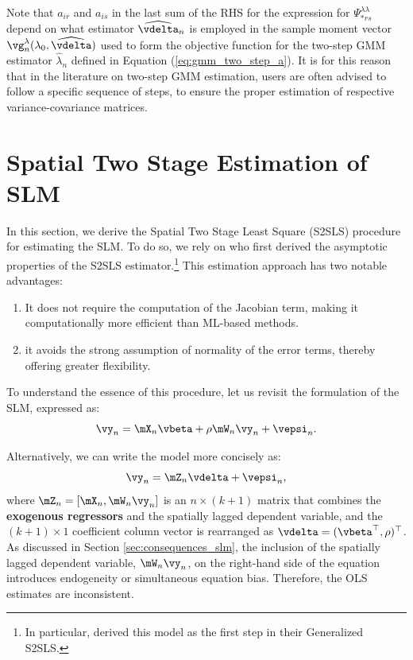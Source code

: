 \documentclass[english,12pt]{book}\usepackage[]{graphicx}\usepackage[]{xcolor}
\begin{document}
Note that $a_{ir}$ and $a_{is}$ in the last sum of the RHS for the expression for $\Psi_{*rs}^{\lambda\lambda}$ depend on what estimator $\widehat{\vdelta}_n$ is employed in the sample moment vector $\vg_n^{\lambda}(\lambda_0, \widehat{\vdelta})$ used to form the objective function for the two-step GMM estimator $\widehat{\lambda}_n$ defined in Equation (\ref{eq:gmm_two_step_a}). It is for this reason that in the literature on two-step GMM estimation, users are often advised to follow a specific sequence of steps, to ensure the proper estimation of respective variance-covariance matrices. 


\section{Spatial Two Stage Estimation of SLM}\label{sec:s2sls}

In this section, we derive the Spatial Two Stage Least Square (S2SLS) procedure for estimating the SLM. To do so, we rely on \cite{kelejian1998generalized} who first derived the asymptotic properties of the S2SLS estimator.\footnote{In particular, \cite{kelejian1998generalized} derived this model as the first step in their Generalized S2SLS.} This estimation approach has two notable advantages:
\begin{enumerate}
  \item It does not require the computation of the Jacobian term, making it computationally more efficient than ML-based methods. 
  \item it avoids the strong assumption of normality of the error terms, thereby offering greater flexibility.
\end{enumerate}

To understand the essence of this procedure, let us revisit the formulation of the SLM, expressed as:
\begin{equation*}
  \vy_n =   \mX_n\vbeta + \rho\mW_n\vy_n + \vepsi_n.
\end{equation*}

Alternatively, we can write the model more concisely as:
\begin{equation*}
  \vy_n = \mZ_n \vdelta + \vepsi_n,
\end{equation*}
%
where $\mZ_n = \left[\mX_n, \mW_n\vy_n\right]$ is an $n \times (k + 1)$ matrix that combines the \textbf{exogenous regressors} and the spatially lagged dependent variable, and the $(k + 1)\times 1$ coefficient column vector is rearranged as  $\vdelta = (\vbeta^\top, \rho)^\top$. As discussed in Section \ref{sec:consequences_slm}, the inclusion of the spatially lagged dependent variable, $\mW_n\vy_n$, on the right-hand side of the equation introduces endogeneity or simultaneous equation bias. Therefore, the OLS estimates are inconsistent.
\end{document}
